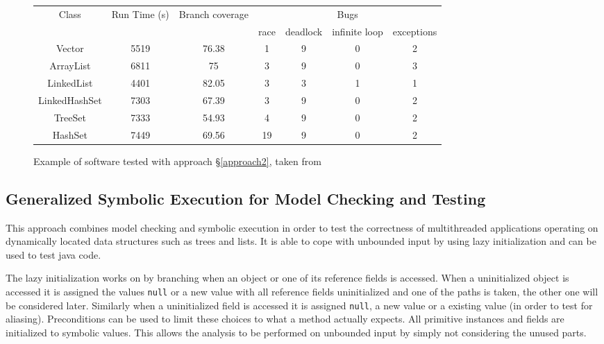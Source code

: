 \documentclass[10pt]{llncs}
\begin{document}
\begin{figure}
	\centering
	
	\begin{tabular}{c | c | c | c | c | c | c}
		Class & Run Time (s) & Branch coverage & \multicolumn{4}{c}{Bugs} \\
		\cline{4-7}
		& & & race & deadlock & infinite loop & exceptions \\
		 
		\hline
		
		Vector & 5519 & 76.38 & 1&9&0&2 \\
		ArrayList & 6811 & 75 & 3&9&0&3 \\
		LinkedList & 4401 & 82.05 & 3&3&1&1 \\
		LinkedHashSet & 7303 & 67.39 & 3&9&0&2 \\
		TreeSet & 7333 & 54.93 & 4&9&0&2 \\
		HashSet & 7449 & 69.56 & 19&9&0&2 \\
	\end{tabular}
	
	\caption{Example of software tested with approach §\ref{approach2}, taken from \cite{base4}}
	\label{example:4}
\end{figure}

\subsection{Generalized Symbolic Execution for Model Checking and Testing \cite{base5}}

This approach combines model checking and symbolic execution in order to test the correctness of multithreaded applications operating on dynamically located data structures such as trees and lists. It is able to cope with unbounded input by using lazy initialization and can be used to test java code.

The lazy initialization works on by branching when an object or one of its reference fields is accessed. When a uninitialized object is accessed it is assigned the values \texttt{null} or a new value with all reference fields uninitialized and one of the paths is taken, the other one will be considered later. Similarly when a uninitialized field is accessed it is assigned \texttt{null}, a new value or a existing value (in order to test for aliasing). Preconditions can be used to limit these choices to what a method actually expects. All primitive instances and fields are initialized to symbolic values. This allows the analysis to be performed on unbounded input by simply not considering the unused parts.
\end{document}
